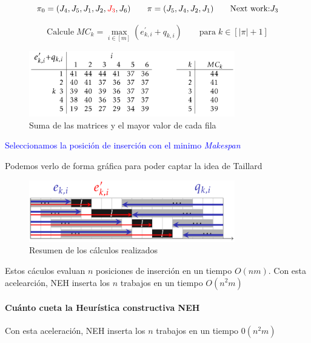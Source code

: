 \documentclass[10pt, a4paper]{article}
\begin{document}
\begin{enumerate}
    \[
      \pi_0 = (J_4, J_5, J_1, J_2, \textcolor{red}{J_3}, J_6) \qquad 
      \pi = (J_5,J_4, J_2, J_1) \qquad \text{Next work:} J_3 
    \]

    \[
      \text{Calcule}\; MC_k = 
      \max_{i \in [m]}(e^{'}_{k, i} + q_{k, i}) \qquad
      \text{para}\; k \in [|\pi|+1]
    \]

    \begin{figure}[H]
      \centering
      \includegraphics[width=0.8\textwidth]{
        ./.github/1733417752.png
      }
      \caption{Suma de las matrices y el mayor valor de 
      cada fila}\label{fig:sum-of-the-matrices-and-each-row's-value-max}
    \end{figure}

    \textcolor{blue}{Seleccionamos la posición de inserción con el minimo 
    \textit{Makespan}}
\end{enumerate}

Podemos verlo de forma gráfica para poder captar la idea de Taillard

\begin{figure}[H]
  \centering
  \includegraphics[width=0.8\textwidth]{./.github/1733417773.png}
  \caption{Resumen de los cálculos 
  realizados}\label{fig:overview-of-the-calculates-performed}
\end{figure}

Estos cáculos evaluan $n$ posiciones de inserción en un tiempo $O(nm)$. Con 
esta acelearción, NEH inserta los $n$ trabajos en un tiempo $O(n^2 m)$

\paragraph{Cuánto cueta la Heurística constructiva NEH}

Con esta aceleración, NEH inserta los $n$ trabajos en un tiempo $0(n^2 m)$
\end{document}
